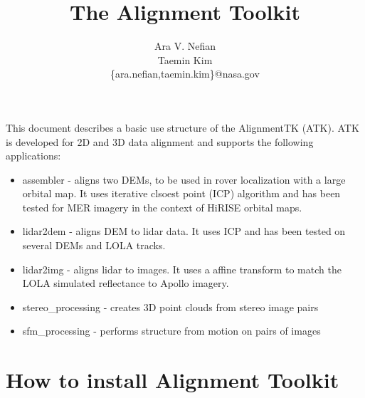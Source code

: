 \documentclass[12pt]{article}
\begin{document}
\title {The Alignment Toolkit}
\author{Ara V. Nefian \\ Taemin Kim\\
\{ara.nefian,taemin.kim\}@nasa.gov}
\maketitle

This document describes a basic use structure of the AlignmentTK (ATK). ATK is developed for 2D and 3D data alignment and supports the following applications:
\begin{itemize}
\item assembler - aligns two DEMs, to be used in rover localization with a large orbital map. It uses iterative clsoest point (ICP) algorithm and has 
been tested for MER imagery in the context of HiRISE orbital maps.
\item lidar2dem - aligns DEM to lidar data. It uses ICP and has been tested on several DEMs and LOLA tracks.
\item lidar2img - aligns lidar to images. It uses a affine transform to match the LOLA simulated reflectance to Apollo imagery.
\item stereo\_processing - creates 3D point clouds from stereo image pairs
\item sfm\_processing - performs structure from motion on pairs of images
\end{itemize} 

\section{How to install Alignment Toolkit}
\end{document}
